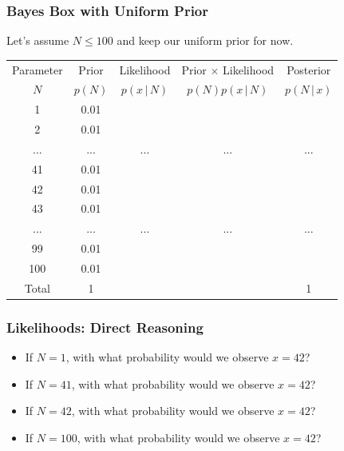 \documentclass{beamer}
\newcommand{\given}{\,|\,}
\begin{document}
\begin{frame}
\frametitle{Bayes Box with Uniform Prior}
Let's assume $N \leq 100$ and keep our uniform prior for now.

\centering
{\footnotesize
\begin{tabular}{|c|c|c|c|c|}
\hline
Parameter & Prior & Likelihood & Prior $\times$ Likelihood & Posterior \\
$N$  & $p(N)$ & $p(x \given N)$ & $p(N)p(x\given N)$ & $p(N\given x)$ \\
\hline
1 & 0.01 & & & \\
2 & 0.01  &  & & \\
... &... &... & ...&... \\
41 & 0.01 &  & & \\
42 & 0.01  &  & & \\
43 & 0.01 & & & \\
... &... &... & ...&... \\
99 & 0.01 & & & \\
100   & 0.01 & & & \\
\hline
Total & 1 & & & 1 \\
\hline
\end{tabular}
}

\end{frame}

\begin{frame}
\frametitle{Likelihoods: Direct Reasoning}

\begin{itemize}
\item If $N=1$, with what probability would we observe $x=42$? \pause
\item If $N=41$, with what probability would we observe $x=42$? \pause
\item If $N=42$, with what probability would we observe $x=42$? \pause
\item If $N=100$, with what probability would we observe $x=42$?
\end{itemize}

\end{frame}
\end{document}

